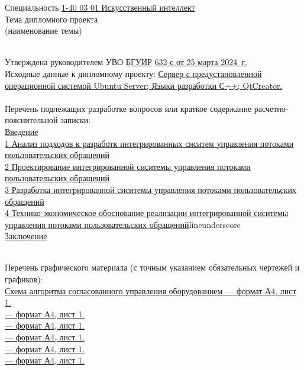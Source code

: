 {\begin{center}
  Специальность \uline{1-40 03 01 Искусственный интеллект}\lineunderscore\\[0.5em]

  Тема дипломного проекта \uline{\topicName}\lineunderscore \\
  {\footnotesize\hspace{15em}(наименование темы)}\\[-0.5em]
  \lineunderscore\\[0.5em]
  \end{center}

  Утверждена руководителем УВО \uline{БГУИР} \textnumero  \uline{632-с от 25 марта 2024~г.}\lineunderscore\\[-0.5em]
  
  Исходные данные к дипломному проекту: \uline{Сервер с предустановленной операционной системой Ubuntu Server; Языки разработки С++; QtCreator.}\lineunderscore\\[0.5em]
  \lineunderscore\\
  
  Перечень подлежащих разработке вопросов или краткое содержание расчетно-пояснительной записки: 
  \lineunderscore\\
  \uline{Введение}\lineunderscore\\
  \uline{1 Анализ подходов к разработк интегрированных сиситем управления потоками пользовательских обращений}\lineunderscore\\
  \uline{2 Проектирование интегрированной сиситемы управления потоками пользовательских обращений}\lineunderscore\\
  \uline{3 Разработка интегрированной сиситемы управления потоками пользовательских обращений}\lineunderscore\\
  \uline{4 Технико-экономическое обоснование реализации интегрированной сиситемы управления потоками пользовательских обращений}lineunderscore\\
  \uline{Заключение}\lineunderscore\\
  \lineunderscore\\
  \clearpage
  \thispagestyle{empty}

  Перечень графического материала (с точным указанием обязательных чертежей и графиков):
  \lineunderscore\\
  \uline{Схема алгоритма согласованного управления оборудованием --- формат А4, лист 1. }\lineunderscore\\
  \uline{ --- формат А4, лист 1. }\lineunderscore\\
  \uline{ --- формат А4, лист 1. }\lineunderscore\\
  \uline{ --- формат А4, лист 1. }\lineunderscore\\
  \uline{ --- формат А4, лист 1. }\lineunderscore\\
  \uline{ --- формат А4, лист 1. }\lineunderscore\\
  \lineunderscore\\

}
